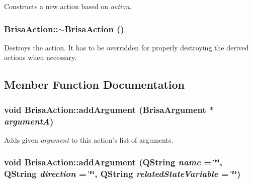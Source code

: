 Constructs a new action based on {\itshape action\/}. \hypertarget{classBrisaUpnp_1_1BrisaAction_ab1cd52221450fe503694492fa1c352c4}{
\subsubsection[{$\sim$BrisaAction}]{\setlength{\rightskip}{0pt plus 5cm}BrisaAction::$\sim$BrisaAction ()}}
\label{classBrisaUpnp_1_1BrisaAction_ab1cd52221450fe503694492fa1c352c4}


Destroys the action. It has to be overridden for properly destroying the derived actions when necessary. 

\subsection{Member Function Documentation}
\hypertarget{classBrisaUpnp_1_1BrisaAction_a991ec9631fdec0971575c0974e8a564b}{
\subsubsection[{addArgument}]{\setlength{\rightskip}{0pt plus 5cm}void BrisaAction::addArgument ({\bf BrisaArgument} $\ast$ {\em argumentA})}}
\label{classBrisaUpnp_1_1BrisaAction_a991ec9631fdec0971575c0974e8a564b}


Adds given {\itshape argument\/} to this action's list of arguments. \hypertarget{classBrisaUpnp_1_1BrisaAction_a1a805cde62089c0c16a52c5ffd0c1370}{
\subsubsection[{addArgument}]{\setlength{\rightskip}{0pt plus 5cm}void BrisaAction::addArgument (QString {\em name} = {\ttfamily \char`\"{}\char`\"{}}, \/  QString {\em direction} = {\ttfamily \char`\"{}\char`\"{}}, \/  QString {\em relatedStateVariable} = {\ttfamily \char`\"{}\char`\"{}})}}
\label{classBrisaUpnp_1_1BrisaAction_a1a805cde62089c0c16a52c5ffd0c1370}


